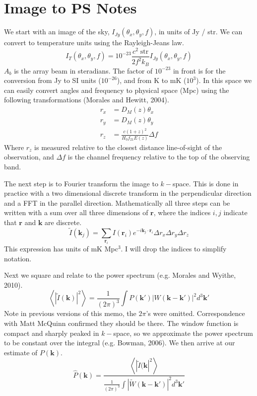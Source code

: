 \documentclass{article}
\begin{document}
\section{Image to PS Notes}

We start with an image of the sky, $I_{Jy}(\theta_x,\theta_y,f)$, in units of Jy / str. We can convert to temperature units using the Rayleigh-Jeans law.
\begin{equation}
I_T(\theta_x,\theta_y,f) = 10^{-23}\frac{c^2 \;\text{str}}{2 f^2 k_B} I_{Jy}(\theta_x,\theta_y,f)
\end{equation}
$A_b$ is the array beam in steradians. The factor of $10^{-23}$ in front is for the conversion from Jy to SI units ($10^{-26}$), and from K to mK ($10^{3}$). In this space we can easily convert angles and frequency to physical space (Mpc) using the following transformations (Morales and Hewitt, 2004).
\begin{subequations}\label{eq:transformations}
\begin{align}
r_x & = D_M(z) \theta_x \\
r_y & = D_M(z) \theta_y \\
r_z & = \frac{c(1+z)^2}{H_0 f_{21} E(z)} \Delta f
\end{align}
\end{subequations}
Where $r_z$ is measured relative to the closest distance line-of-sight of the observation, and $\Delta f$ is the channel frequency relative to the top of the observing band.

The next step is to Fourier transform the image to $k-$space. This is done in practice with a two dimensional discrete transform in the perpendicular direction and a FFT in the parallel direction. Mathematically all three steps can be written with a sum over all three dimensions of $\mathbf{r}$, where the indices $i,j$ indicate that $\mathbf{r}$ and $\mathbf{k}$ are discrete.
\begin{equation}
\tilde{I}(\mathbf{k}_j) = \sum_{\mathbf{r}_i} I(\mathbf{r}_i)e^{-i \mathbf{k}_j \cdot \mathbf{r}_i} \Delta r_x \Delta r_y \Delta r_z
\end{equation}
This expression has units of mK Mpc$^3$. I will drop the indices to simplify notation.

Next we square and relate to the power spectrum (e.g. Morales and Wyithe, 2010).
\begin{equation}
\left<\left|\tilde{I}(\mathbf{k})\right|^2\right> = \frac{1}{(2\pi)^3}\int P(\mathbf{k}')\left|W(\mathbf{k}-\mathbf{k}')\right|^2 d^3\mathbf{k}'
\end{equation}
Note in previous versions of this memo, the $2\pi$'s were omitted. Correspondence with Matt McQuinn confirmed they should be there.
The window function is compact and sharply peaked in $k-$space, so we approximate the power spectrum to be constant over the integral (e.g. Bowman, 2006). We then arrive at our estimate of $P(\mathbf{k})$.
\begin{equation}\label{eq:PS}
\hat{P}(\mathbf{k}) = \frac{\left<\left|\tilde{I}(\mathbf{k}\right|^2\right> }{ \frac{1}{(2\pi)^3}\int \left|\widetilde{W}(\mathbf{k}-\mathbf{k}')\right|^2 d^3\mathbf{k}'}
\end{equation}
\end{document}
